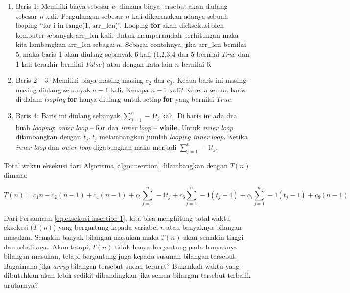 \begin{enumerate}
	\item Baris 1: Memiliki biaya sebesar $c_1$ dimana biaya tersebut akan diulang sebesar $n$ kali. Pengulangan sebesar $n$ kali dikarenakan adanya sebuah looping ``for i in range(1, arr\_len)''. Looping \textbf{for} akan dieksekusi oleh komputer sebanyak arr\_len kali. Untuk mempermudah perhitungan maka kita lambangkan arr\_len sebagai $n$. Sebagai contohnya, jika arr\_len bernilai 5, maka baris 1 akan diulang sebanyak 6 kali (1,2,3,4 dan 5 bernilai $True$ dan 1 kali terakhir bernilai $False$) atau dengan kata lain $n$ bernilai 6.
	\item Baris 2 -- 3: Memiliki biaya masing-masing $c_{2}$ dan $c_{3}$. Kedua baris ini masing-masing diulang sebanyak $n-1$ kali. Kenapa $n-1$ kali? Karena semua baris di dalam \textit{looping} \textbf{for} hanya diulang untuk setiap \textbf{for} yang bernilai $True$.
	\item Baris 4: Baris ini diulang sebanyak $\sum\limits_{j=1}^n-1 t_{j}$ kali. Di baris ini ada dua buah \textit{looping}: \textit{outer loop} -- \textbf{for} dan \textit{inner loop} -- \textbf{while}. Untuk \textit{inner loop} dilambangkan dengan $t_{j}$. $t_{j}$ melambangkan jumlah \textit{looping inner loop}. Ketika \textit{inner loop} dan \textit{outer loop} digabungkan maka menjadi $\sum\limits_{j=1}^n-1 t_{j}$.  
\end{enumerate}                                       
                                     
Total waktu eksekusi dari Algoritma \ref{algo:insertion} dilambangkan dengan $T(n)$ dimana:

\begin{equation}\label{eq:eksekusi-insertion-1}
    T(n) = c_{1}n + c_{2}(n-1) + c_{4}(n-1) + c_{5}\sum\limits_{j=1}^n-1 t_{j} + c_{6}\sum\limits_{j=1}^n-1 (t_{j}-1) + c_{7}\sum\limits_{j=1}^n-1 (t_{j}-1) + c_{8}(n-1) 
\end{equation} 

Dari Persamaan \ref{eq:eksekusi-insertion-1}, kita bisa menghitung total waktu eksekusi ($T(n)$) yang bergantung kepada variabel $n$ atau banyaknya bilangan masukan. Semakin banyak bilangan masukan maka $T(n)$ akan semakin tinggi dan sebaliknya. Akan tetapi, $T(n)$ tidak hanya bergantung pada banyaknya bilangan masukan, tetapi bergantung juga kepada susunan bilangan tersebut. Bagaimana jika \textit{array} bilangan tersebut sudah terurut? Bukankah waktu yang dibutuhkan akan lebih sedikit dibandingkan jika semua bilangan tersebut terbalik urutannya?

